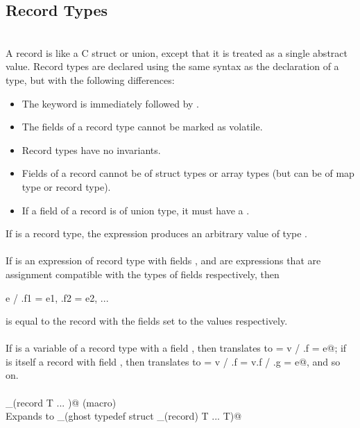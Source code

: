 \documentclass[preprint,nocopyrightspace]{sigplanconf}
\begin{document}
{{\subsection{Record Types}
\\
A record is like a C struct or union, except that it is treated as a
single abstract value.  Record types are declared using the same syntax as
the declaration of a  type, but with the following
differences:
\begin{itemize}
\item The keyword  is immediately followed by
 .
\item The fields of a record type cannot be marked as volatile.
\item Record types have no invariants.
\item Fields of a record cannot be of struct types or array types (but
can be of map type or record type). 
\item If a field of a record is of union type, it must have
a .
\end{itemize}

If  is a record type, the expression  produces an arbitrary
value of type .
\\\\
If  is an expression of record type with
fields , and  are expressions that are
assignment compatible with the types of fields 
respectively, then
\begin{VCC}
  e / { .f1 = e1, .f2 = e2, ...}
\end{VCC}
is equal to the record  with the fields  set
to the values  respectively.
\\\\
If  is a variable of a record type with a field , then
 translates to \vcc@v = v / {.f = e}@; if  is
itself a record with field , then  translates to 
\vcc@v = v / {.f = v.f / {.g = e}}@, and so on.
\\\\
\vcc@_(record T { ... })@ (macro)\\
Expands to \vcc@_(ghost typedef struct _(record) T { ... } T)@

}}
\end{document}
